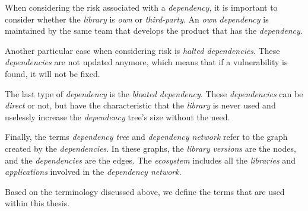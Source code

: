 When considering the risk associated with a \textit{dependency}, it is important to consider whether the \textit{library} is \textit{own} or \textit{third-party}. An \textit{own} \textit{dependency} is maintained by the same team that develops the product that has the \textit{dependency}.

Another particular case when considering risk is \textit{halted dependencies}. These \textit{dependencies} are not updated anymore, which means that if a vulnerability is found, it will not be fixed.

The last type of \textit{dependency} is the \textit{bloated dependency}. These \textit{dependencies} can be \textit{direct} or not, but have the characteristic that the \textit{library} is never used and uselessly increase the \textit{dependency} tree's size without the need.

Finally, the terms \textit{dependency tree} and \textit{dependency network} refer to the graph created by the \textit{dependencies}. In these graphs, the \textit{library} \textit{versions} are the nodes, and the \textit{dependencies} are the edges. The \textit{ecosystem} includes all the \textit{libraries} and \textit{applications} involved in the \textit{dependency network}.

\blankl
Based on the terminology discussed above, we define the terms that are used within this thesis.

